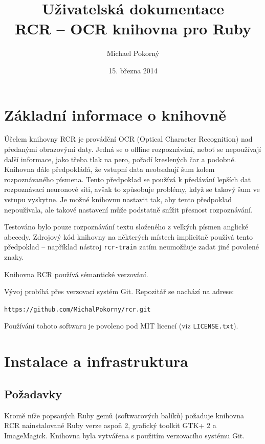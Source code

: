 \documentclass[a4paper]{article}
\def\datum{15. března 2014}
\def\githuburl{https://github.com/MichalPokorny/rcr.git}
\begin{document}
\title{Uživatelská dokumentace \\ RCR -- OCR knihovna pro Ruby}
\author{Michael Pokorný}
\date{\datum}

\maketitle

\tableofcontents

\section{Základní informace o knihovně}
Účelem knihovny RCR je provádění OCR (Optical Character Recognition) nad
předanými obrazovými daty. Jedná se o offline rozpoznávání, neboť
se nepoužívají další informace, jako třeba tlak na pero, pořadí kreslených
čar a podobné. Knihovna dále předpokládá, že vstupní data neobsahují
šum kolem rozpoznávaného písmena. Tento předpoklad se používá k předávání
lepších dat rozpoznávací neuronové síti, avšak to způsobuje problémy,
když se takový šum ve vstupu vyskytne. Je možné knihovnu nastavit tak, aby
tento předpoklad nepoužívala, ale takové nastavení může podstatně snížit
přesnost rozpoznávání.

Testováno bylo pouze rozpoznávání textu složeného z velkých písmen anglické
abecedy. Zdrojový kód knihovny na některých místech implicitně používá tento
předpoklad -- například nástroj \texttt{rcr-train} zatím neumožňuje zadat
jiné povolené znaky.

Knihovna RCR používá sémantické verzování.

Vývoj probíhá přes verzovací systém Git. Repozitář se nachází
na adrese:
\begin{center}
	\texttt{\githuburl}
\end{center}

Používání tohoto softwaru je povoleno pod MIT licencí (viz \texttt{LICENSE.txt}).

\section{Instalace a infrastruktura}
\subsection{Požadavky}
Kromě níže popsaných Ruby gemů (softwarových balíků) požaduje knihovna RCR
nainstalované Ruby verze aspoň 2, grafický toolkit GTK+ 2 a ImageMagick.
Knihovna byla vytvářena s použitím verzovacího systému Git.
\end{document}
